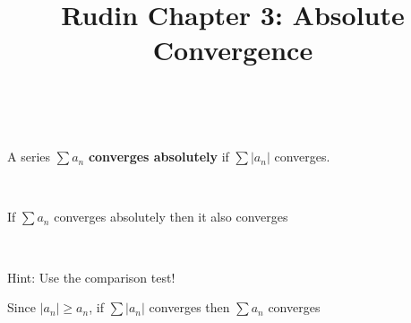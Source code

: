 \documentclass{article}
\title{Rudin Chapter 3: Absolute Convergence}
\begin{document}
\maketitle

\begin{definition}
\

A series $\sum a_n $ \textbf{converges absolutely} if $\sum \vert a_n \vert$ converges. 
\end{definition}

\begin{theorem}
\

If $\sum a_n $ converges absolutely then it also converges
\end{theorem}

\begin{customproof}
\

Hint: Use the comparison test!

Since $\vert a_n \vert \geq a_n$, if $\sum \vert a_n \vert$ converges then $\sum a_n$ converges
\end{customproof}
\end{document}
